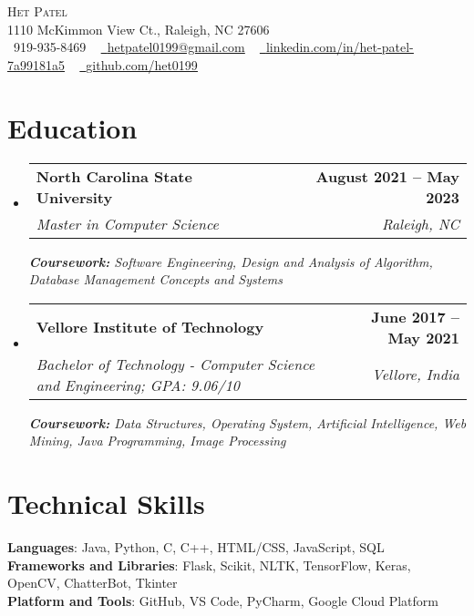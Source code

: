 \documentclass[letterpaper,11pt]{article}
\makeatletter
\newcommand{\resumeSubheading}[4]{
  \vspace{-2pt}\item
    \begin{tabular*}{1.0\textwidth}[t]{l@{\extracolsep{\fill}}r}
      \textbf{#1} & \textbf{\small #2} \\
      \textit{\small#3} & \textit{\small #4} \\
    \end{tabular*}\vspace{-7pt}
}
\newcommand{\resumeSubHeadingListStart}{\begin{itemize}[leftmargin=0.0in, label={}]}
\newcommand{\resumeSubHeadingListEnd}{\end{itemize}}
\makeatother
\begin{document}
\begin{center}
    {\Huge \scshape Het Patel} \\ \vspace{1pt}
    1110 McKimmon View Ct., Raleigh, NC 27606 \\ \vspace{1pt}
    \small \raisebox{-0.1\height}\faPhone\ 919-935-8469 ~ \href{mailto:x@gmail.com}{\raisebox{-0.2\height}\faEnvelope\  \underline{hetpatel0199@gmail.com}} ~ 
    \href{https://linkedin.com/in//}{\raisebox{-0.2\height}\faLinkedin\ \underline{linkedin.com/in/het-patel-7a99181a5}}  ~
    \href{https://github.com/}{\raisebox{-0.2\height}\faGithub\ \underline{github.com/het0199}}
    \vspace{-8pt}
\end{center}


\section{Education}
  \resumeSubHeadingListStart
    \resumeSubheading
      {North Carolina State University}{August 2021 -- May 2023}
      {Master in Computer Science}{Raleigh, NC}
      {\scriptsize \textit{ \footnotesize{\newline{}\textbf{Coursework:} Software Engineering, Design and Analysis of Algorithm, Database Management Concepts and Systems}}}
  \resumeSubHeadingListEnd
  \vspace{-15pt}
  \resumeSubHeadingListStart
    \resumeSubheading
      {Vellore Institute of Technology}{June 2017 -- May 2021}
      {Bachelor of Technology - Computer Science and Engineering; GPA: 9.06/10}{Vellore, India}
      {\scriptsize \textit{ \footnotesize{\newline{}\textbf{Coursework:} Data Structures, Operating System, Artificial Intelligence, Web Mining, Java Programming, Image Processing}}}
  \resumeSubHeadingListEnd
\vspace{-18pt}
\section{Technical Skills}
 \begin{itemize}[leftmargin=0.15in, label={}]
    \small{\item{
     \textbf{Languages}{: Java, Python, C, C++, HTML/CSS, JavaScript, SQL} \\
     \textbf{Frameworks and Libraries}{: Flask, Scikit, NLTK, TensorFlow, Keras, OpenCV, ChatterBot, Tkinter} \\
     \textbf{Platform and Tools}{: GitHub, VS Code, PyCharm, Google Cloud Platform} \\
    }}
 \end{itemize}
 \vspace{-18pt}
\end{document}
